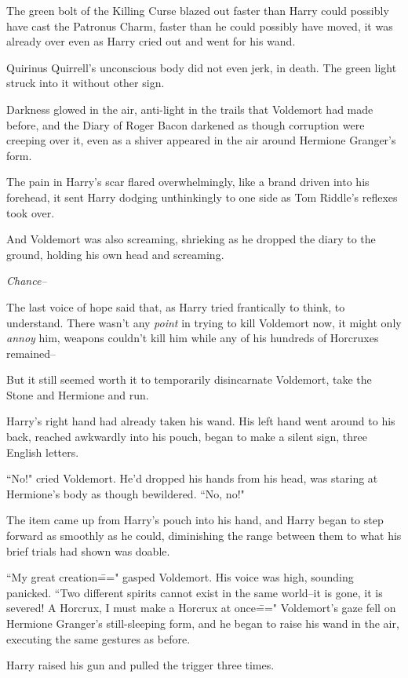 The green bolt of the Killing Curse blazed out faster than Harry could possibly have cast the Patronus Charm, faster than he could possibly have moved, it was already over even as Harry cried out and went for his wand.

Quirinus Quirrell's unconscious body did not even jerk, in death. The green light struck into it without other sign.

Darkness glowed in the air, anti-light in the trails that Voldemort had made before, and the Diary of Roger Bacon darkened as though corruption were creeping over it, even as a shiver appeared in the air around Hermione Granger's form.

The pain in Harry's scar flared overwhelmingly, like a brand driven into his forehead, it sent Harry dodging unthinkingly to one side as Tom Riddle's reflexes took over.

And Voldemort was also screaming, shrieking as he dropped the diary to the ground, holding his own head and screaming.

\emph{Chance\---}

The last voice of hope said that, as Harry tried frantically to think, to understand. There wasn't any \emph{point} in trying to kill Voldemort now, it might only \emph{annoy} him, weapons couldn't kill him while any of his hundreds of Horcruxes remained\---

But it still seemed worth it to temporarily disincarnate Voldemort, take the Stone and Hermione and run.

Harry's right hand had already taken his wand. His left hand went around to his back, reached awkwardly into his pouch, began to make a silent sign, three English letters.

``No!" cried Voldemort. He'd dropped his hands from his head, was staring at Hermione's body as though bewildered. ``No, no!"

The item came up from Harry's pouch into his hand, and Harry began to step forward as smoothly as he could, diminishing the range between them to what his brief trials had shown was doable.

``My great creation\===" gasped Voldemort. His voice was high, sounding panicked. ``Two different spirits cannot exist in the same world\---it is gone, it is severed! A Horcrux, I must make a Horcrux at once\===" Voldemort's gaze fell on Hermione Granger's still-sleeping form, and he began to raise his wand in the air, executing the same gestures as before.

Harry raised his gun and pulled the trigger three times.

